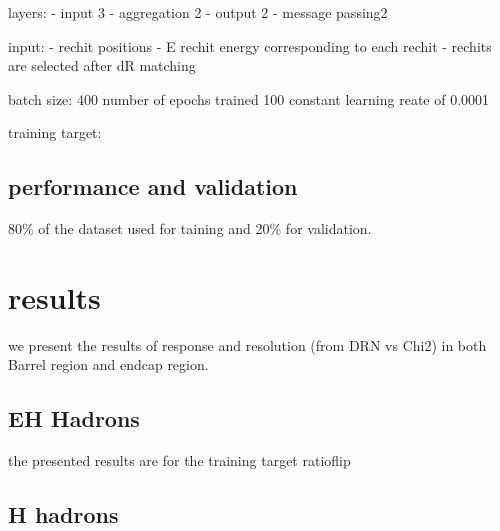 layers:
- input 3
- aggregation 2
- output 2
- message passing2 

input:
- rechit positions
- E rechit energy corresponding to each rechit
- rechits are selected after dR matching %

batch size: 400
number of epochs trained 100
constant learning reate of 0.0001

training target:

\subsection{performance and validation}
80\% of the dataset used for taining and 20\% for validation.

\section{results}
we present the results of response and resolution (from DRN vs Chi2) in  both Barrel region and endcap region.

\subsection{EH Hadrons}
the presented results are for the training target ratioflip





\subsection{H hadrons}




